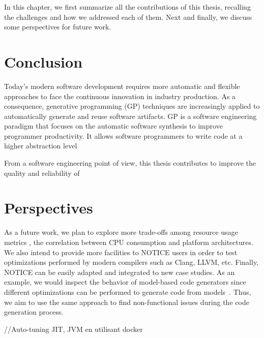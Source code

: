 In this chapter, we first summarize all the contributions of this thesis, recalling the challenges and how we addressed each of them. Next and finally, we discuss some perspectives for future work.

\section{Conclusion}
Today's modern software development requires more automatic and flexible approaches to face the continuous innovation in industry production.
As a consequence, generative programming (GP) techniques are increasingly applied to automatically generate and reuse software artifacts.
GP is a software engineering paradigm that focuses on the automatic software synthesis to improve programmer productivity. It allows software programmers to write code at a higher abstraction level 
 

From a software engineering point of view, this thesis contributes to improve the quality and reliability of

\section{Perspectives}
As a future work, we plan to explore more trade-offs among resource usage metrics \eg, the correlation between CPU consumption and platform architectures. 
We also intend to provide more facilities to NOTICE users in order to test optimizations performed by modern compilers such as Clang, LLVM, etc.
Finally, NOTICE can be easily adapted and integrated to new case studies. As an example, we would inspect the behavior of model-based code generators since different optimizations can be performed to generate code from models~\cite{stuermer2007systematic}. Thus, we aim to use the same approach to find non-functional issues during the code generation process.

//Auto-tuning JIT, JVM en utilisant docker